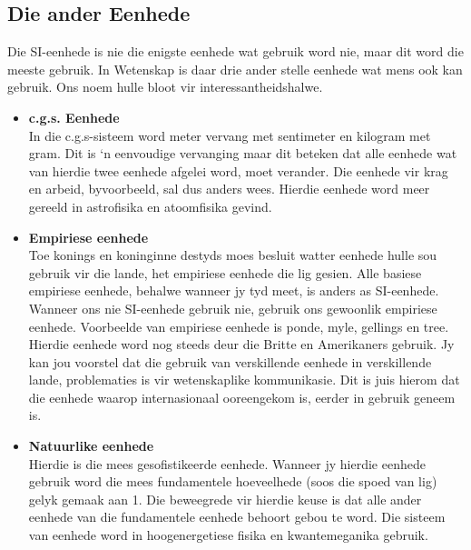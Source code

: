  \subsection*{Die ander Eenhede}
            \nopagebreak
Die SI-eenhede is nie die enigste eenhede wat gebruik word nie, maar dit word die meeste gebruik. In Wetenskap is daar drie ander stelle eenhede wat mens ook kan gebruik. Ons noem hulle bloot vir interessantheidshalwe. 
\begin{itemize}
 \item \textbf{c.g.s. Eenhede} \\
In die c.g.s-sisteem word meter vervang met sentimeter en kilogram met gram. Dit is ‘n eenvoudige vervanging maar dit beteken dat alle eenhede wat van hierdie twee eenhede afgelei word, moet verander. Die eenhede vir krag en arbeid, byvoorbeeld, sal dus anders wees. Hierdie eenhede word meer gereeld in astrofisika en atoomfisika gevind.
\item \textbf{Empiriese eenhede} \\
Toe konings en koninginne destyds moes besluit watter eenhede hulle sou gebruik vir die lande, het empiriese eenhede die lig gesien. Alle basiese empiriese eenhede, behalwe wanneer jy tyd meet, is anders as SI-eenhede. Wanneer ons nie SI-eenhede gebruik nie, gebruik ons gewoonlik empiriese eenhede. Voorbeelde van empiriese eenhede is ponde, myle, gellings en tree. Hierdie eenhede word nog steeds deur die Britte en Amerikaners gebruik. Jy kan jou voorstel dat die gebruik van verskillende eenhede in verskillende lande, problematies is vir wetenskaplike kommunikasie. Dit is juis hierom dat die eenhede waarop internasionaal ooreengekom is, eerder in gebruik geneem is.
\item \textbf{Natuurlike eenhede} \\
Hierdie is die mees gesofistikeerde eenhede. Wanneer jy hierdie eenhede gebruik word die mees fundamentele hoeveelhede (soos die spoed van lig) gelyk gemaak aan 1. Die beweegrede vir hierdie keuse is dat alle ander eenhede van die fundamentele eenhede behoort gebou te word. Die sisteem van eenhede word in hoogenergetiese fisika en kwantemeganika gebruik. 
\end{itemize}
